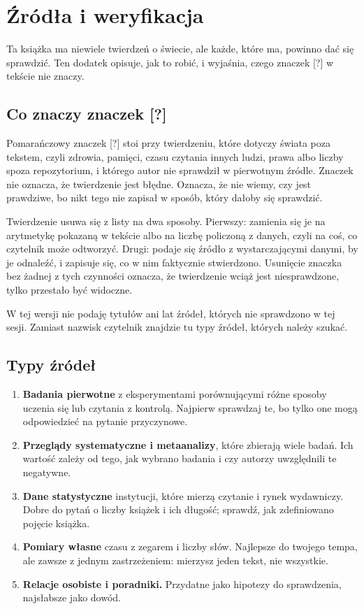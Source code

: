 \chapter{Źródła i weryfikacja}

Ta książka ma niewiele twierdzeń o świecie, ale każde, które ma, powinno dać się sprawdzić.
Ten dodatek opisuje, jak to robić, i wyjaśnia, czego znaczek [?] w tekście nie znaczy.

\section{Co znaczy znaczek [?]}
Pomarańczowy znaczek [?] stoi przy twierdzeniu, które dotyczy świata poza tekstem, czyli zdrowia,
pamięci, czasu czytania innych ludzi, prawa albo liczby spoza repozytorium, i którego autor nie
sprawdził w pierwotnym źródle. Znaczek nie oznacza, że twierdzenie jest błędne. Oznacza, że nie
wiemy, czy jest prawdziwe, bo nikt tego nie zapisał w sposób, który dałoby się sprawdzić.

Twierdzenie usuwa się z listy na dwa sposoby. Pierwszy: zamienia się je na arytmetykę pokazaną
w tekście albo na liczbę policzoną z danych, czyli na coś, co czytelnik może odtworzyć. Drugi:
podaje się źródło z wystarczającymi danymi, by je odnaleźć, i zapisuje się, co w nim faktycznie
stwierdzono. Usunięcie znaczka bez żadnej z tych czynności oznacza, że twierdzenie wciąż jest
niesprawdzone, tylko przestało być widoczne.

W tej wersji nie podaję tytułów ani lat źródeł, których nie sprawdzono w tej sesji. Zamiast
nazwisk czytelnik znajdzie tu typy źródeł, których należy szukać.

\section{Typy źródeł}
\begin{enumerate}
\item \textbf{Badania pierwotne} z eksperymentami porównującymi różne sposoby uczenia się lub
czytania z kontrolą. Najpierw sprawdzaj te, bo tylko one mogą odpowiedzieć na pytanie
przyczynowe.
\item \textbf{Przeglądy systematyczne i metaanalizy}, które zbierają wiele badań. Ich wartość
zależy od tego, jak wybrano badania i czy autorzy uwzględnili te negatywne.
\item \textbf{Dane statystyczne} instytucji, które mierzą czytanie i rynek wydawniczy. Dobre do
pytań o liczby książek i ich długość; sprawdź, jak zdefiniowano pojęcie \glqq książka\grqq{}.
\item \textbf{Pomiary własne} czasu z zegarem i liczby słów. Najlepsze do twojego tempa, ale
zawsze z jednym zastrzeżeniem: mierzysz jeden tekst, nie wszystkie.
\item \textbf{Relacje osobiste i poradniki.} Przydatne jako hipotezy do sprawdzenia, najsłabsze
jako dowód.
\end{enumerate}

